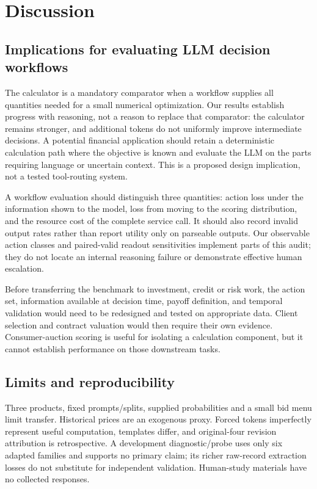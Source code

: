 \documentclass[sigconf,anonymous,nonacm]{acmart}
\begin{document}
\section{Discussion}
\subsection{Implications for evaluating LLM decision workflows}
The calculator is a mandatory comparator when a workflow supplies all quantities needed for a small numerical optimization. Our results establish progress with reasoning, not a reason to replace that comparator: the calculator remains stronger, and additional tokens do not uniformly improve intermediate decisions. A potential financial application should retain a deterministic calculation path where the objective is known and evaluate the LLM on the parts requiring language or uncertain context. This is a proposed design implication, not a tested tool-routing system.

A workflow evaluation should distinguish three quantities: action loss under the information shown to the model, loss from moving to the scoring distribution, and the resource cost of the complete service call. It should also record invalid output rates rather than report utility only on parseable outputs. Our observable action classes and paired-valid readout sensitivities implement parts of this audit; they do not locate an internal reasoning failure or demonstrate effective human escalation.

Before transferring the benchmark to investment, credit or risk work, the action set, information available at decision time, payoff definition, and temporal validation would need to be redesigned and tested on appropriate data. Client selection and contract valuation would then require their own evidence. Consumer-auction scoring is useful for isolating a calculation component, but it cannot establish performance on those downstream tasks.
\subsection{Limits and reproducibility}
Three products, fixed prompts/splits, supplied probabilities and a small bid menu limit transfer. Historical prices are an exogenous proxy. Forced tokens imperfectly represent useful computation, templates differ, and original-four revision attribution is retrospective. A development diagnostic/probe uses only six adapted families and supports no primary claim; its richer raw-record extraction losses do not substitute for independent validation. Human-study materials have no collected responses.
\end{document}
